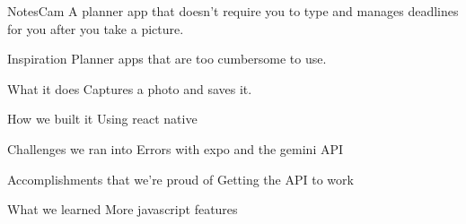 NotesCam
A planner app that doesn't require you to type and manages deadlines for you after you take a picture.

Inspiration
Planner apps that are too cumbersome to use.

What it does
Captures a photo and saves it.

How we built it
Using react native

Challenges we ran into
Errors with expo and the gemini API

Accomplishments that we're proud of
Getting the API to work

What we learned
More javascript features
